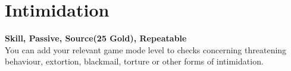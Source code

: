 \section{Intimidation}\label{sec:intimidation}
\textbf{Skill, Passive, Source(25 Gold), Repeatable}\\
You can add your relevant game mode level to checks concerning threatening behaviour, extortion, blackmail, torture or other forms of intimidation.